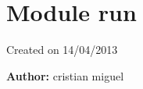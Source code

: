 %
%
%


\section{Module run}

    \label{run}
Created on 14/04/2013

\textbf{Author:} cristian miguel



